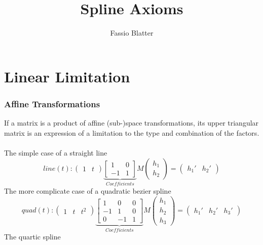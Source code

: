 \documentclass[a4paper,landscape]{report}
\begin{document}
\title{Spline Axioms}
\author{Fassio Blatter}
\maketitle

\chapter{Linear Limitation}

\subsection{Affine Transformations}
If a matrix is a product of affine (sub-)space transformations, its upper triangular matrix is an expression of a limitation to the type and combination of the factors.\\\\
The simple case of a straight line
\begin{equation}
line(t):
\begin{pmatrix}
1 & t
\end{pmatrix}
\underbrace{\begin{bmatrix}
1 & 0\\
-1 & 1
\end{bmatrix}}_{Coefficients}
M
\begin{pmatrix}
h_{1} \\
h_{2}
\end{pmatrix}
=
\begin{pmatrix}
h_{1}' & h_{2}'
\end{pmatrix}
\end{equation}
The more complicate case of a quadratic bezier spline
\begin{equation}
quad(t):
\begin{pmatrix}
1 & t & t^2
\end{pmatrix}
\underbrace{\begin{bmatrix}
1 & 0 & 0\\
-1 & 1 & 0\\
0 & -1 &1
\end{bmatrix}}_{Coefficients}
M
\begin{pmatrix}
h_{1} \\
h_{2} \\
h_{3}
\end{pmatrix}
=
\begin{pmatrix}
h_{1}' & h_{2}' & h_{3}'
\end{pmatrix}
\end{equation}
The quartic spline
\end{document}
